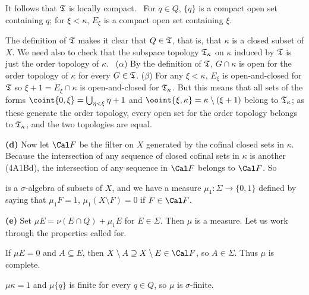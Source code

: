 {\medskip

 It follows that $\frak T$ is locally compact.   \Prf\
For $q\in Q$, $\{q\}$ is a compact open set containing $q$;  for
$\xi<\kappa$, $E_{\xi}$ is a compact open set containing $\xi$.\ \Qed

\medskip

 The definition of $\frak T$ makes it clear that
$Q\in\frak T$, that is, that $\kappa$ is a closed subset of $X$.   We
need also to check that the subspace topology $\frak T_{\kappa}$ on
$\kappa$ induced by $\frak T$ is just the order topology of $\kappa$.
\Prf\ ($\alpha$) By the definition of $\frak T$, $G\cap\kappa$ is open
for the order topology of $\kappa$ for every $G\in\frak T$.    ($\beta$)
For any $\xi<\kappa$, $E_{\xi}$ is open-and-closed for $\frak T$ so
$\xi+1=E_{\xi}\cap\kappa$ is
open-and-closed for $\frak T_{\kappa}$.   But this means that all sets
of the forms $\coint{0,\xi}=\bigcup_{\eta<\xi}\eta+1$ and
$\ooint{\xi,\kappa}=\kappa\setminus(\xi+1)$ belong to $\frak
T_{\kappa}$;  as these generate the order topology, every open set for
the order topology belongs to $\frak T_{\kappa}$, and the two topologies
are equal.\ \Qed

\medskip

{\bf (d)} Now let $\Cal F$ be the filter on $X$ generated by the cofinal
closed
sets in $\kappa$.   Because the intersection of any sequence of closed
cofinal sets in $\kappa$ is another (4A1Bd), the intersection of any
sequence in $\Cal F$ belongs to $\Cal F$.   So


\noindent is a $\sigma$-algebra of subsets of $X$, and we have a measure
$\mu_1:\Sigma\to\{0,1\}$ defined by saying that $\mu_1F=1$,
$\mu_1(X\setminus F)=0$ if $F\in\Cal F$.

\medskip

{\bf (e)} Set $\mu E=\nu(E\cap Q)+\mu_1E$ for $E\in\Sigma$.   Then $\mu$
is a measure.   Let us work through the properties called for.

\medskip

 If $\mu E=0$ and $A\subseteq E$, then $X\setminus
A\supseteq X\setminus E\in\Cal F$, so $A\in\Sigma$.   Thus $\mu$ is
complete.

\medskip

 $\mu\kappa=1$ and $\mu\{q\}$ is finite for every $q\in
Q$, so $\mu$ is $\sigma$-finite.

\medskip

}
